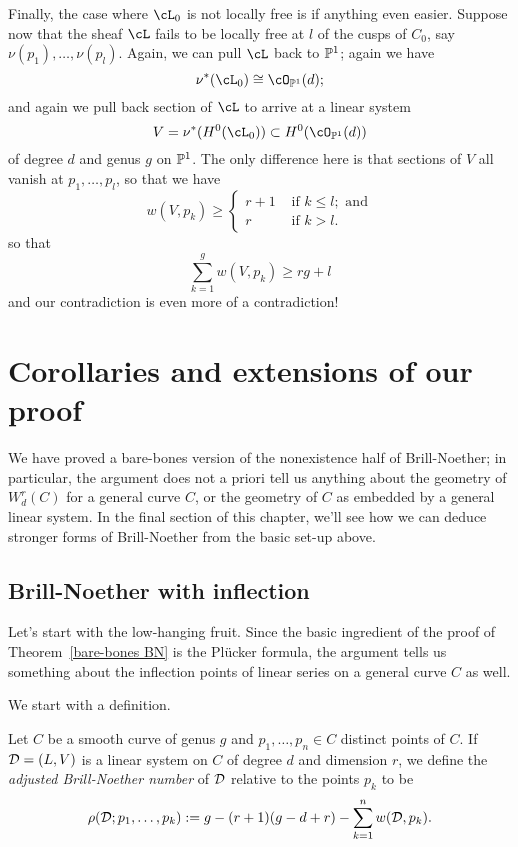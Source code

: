 Finally, the case where $\cL_0$ is not locally free is if anything even easier. Suppose now that the sheaf $\cL$ fails to be locally free at $l$ of the cusps of $C_0$, say $\nu(p_1),\dots,\nu(p_l)$. Again, we can pull $\cL$ back to $\PP^1$; again we have
$$
\nu^*(\cL_0) \cong \cO_{\PP^1}(d);
$$  
and again we pull back section of $\cL$ to arrive at a linear system
$$
V = \nu^*(H^0(\cL_0)) \subset H^0(\cO_{\PP^1}(d))
$$
of degree $d$ and genus $g$ on $\PP^1$. The only difference here is that sections of $V$ all vanish at $p_1,\dots,p_l$, so that we have
$$
w(V,p_k) \geq 
\begin{cases}
r+1 &\text{ if } k \leq l; \text{ and} \\
r  &\text{ if } k > l.
\end{cases}
$$
so that
$$
\sum_{k=1}^g w(V, p_k) \geq rg + l
$$
and our contradiction is even more of a contradiction!

\section{Corollaries and extensions of our proof}

We have proved a bare-bones version of the nonexistence half of Brill-Noether; in particular, the argument does not a priori tell us anything about the geometry of $W^r_d(C)$ for a general curve $C$, or the geometry of $C$ as embedded by a general linear system. In the final section of this chapter, we'll see how we can deduce stronger forms of Brill-Noether from the basic set-up above.

\subsection{Brill-Noether with inflection}

Let's start with the low-hanging fruit. Since the basic ingredient of the proof of Theorem~\ref{bare-bones BN} is the Pl\"ucker formula, the argument tells us something about the inflection points of linear series on a general curve $C$ as well.

We start with a definition.

\begin{definition}
Let $C$ be a smooth curve of genus $g$ and $p_1,\dots,p_n \in C$ distinct points of $C$. If $\cD = (L,V)$ is a linear system on $C$ of degree $d$ and dimension $r$, we define the \emph{adjusted Brill-Noether number} of $\cD$ relative to the points $p_k$ to be
$$
\rho(\cD; p_1,\dots,p_k) := g - (r+1)(g-d+r) - \sum_{k=1}^n w(\cD,p_k).
$$
\end{definition}

